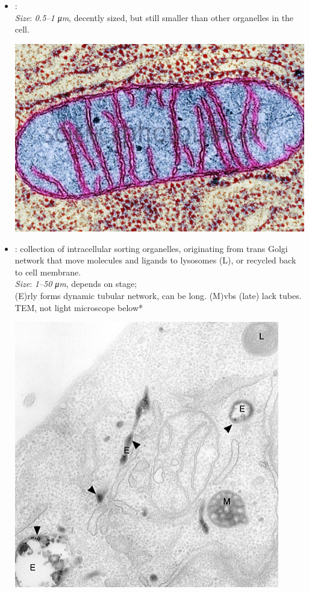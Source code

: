\begin{multicols}{2}
\begin{itemize}
\begin{center}
  \end{center}
  \item {}: \\
  \textit{Size}: \emph{0.5--1 \si{\micro m}}, decently sized, but still smaller than other organelles in the cell.
  \begin{center}
    \hspace{-30pt}\includegraphics[width=0.75\columnwidth]{images/week-1-powerhouse.png}
  \end{center}
  \item {}: collection of intracellular sorting organelles, originating from trans Golgi network that move molecules and ligands to lysosomes (L), or recycled back to cell membrane.\\
  \textit{Size}: \emph{1--50 \si{\micro m}}, depends on stage;\\
  (E)rly forms dynamic tubular network, can be long. %
  (M)vbs (late) lack tubes.\\ %
  TEM, not light microscope below*
  \begin{center}
    \hspace{-30pt}\includegraphics[width=0.75\columnwidth]{images/week-1-endosome.png}

\end{center}
\end{itemize}
\end{multicols}
